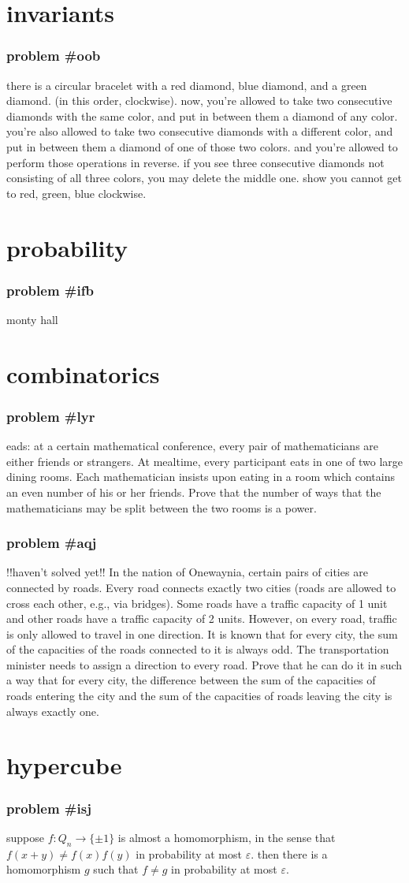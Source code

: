 \documentclass{article}
\newcommand{\problem}[1]{\subsubsection*{\textbf{problem \##1}}}
\newcommand{\chapter}[1]{\section*{#1}}
\begin{document}
\chapter{invariants}
\problem{oob} there is a circular bracelet with a red diamond, blue diamond, and a green diamond. (in this order, clockwise). now, you're allowed to take two consecutive diamonds with the same color, and put in between them a diamond of any color. you're also allowed to take two consecutive diamonds with a different color, and put in between them a diamond of one of those two colors. and you're allowed to perform those operations in reverse. if you see three consecutive diamonds not consisting of all three colors, you may delete the middle one. show you cannot get to red, green, blue clockwise.
\chapter{probability}
\problem{ifb} monty hall
\chapter{combinatorics}
\problem{lyr} eads: at a certain mathematical conference, every pair of mathematicians are either friends or strangers.
At mealtime, every participant eats in one of two large dining rooms. Each mathematician insists upon eating in a room which contains an even number of his or her friends. Prove that the number of ways that the mathematicians may be split between the two rooms is a power.
\problem{aqj} !!haven't solved yet!! In the nation of Onewaynia, certain pairs of cities are connected by roads. Every road connects exactly two cities (roads are allowed to cross each other, e.g., via bridges). Some roads have a traffic capacity of 1 unit and other roads have a traffic capacity of 2 units. However, on every road, traffic is only allowed to travel in one direction. It is known that for every city, the sum of the capacities of the roads connected to it is always odd. The transportation minister needs to assign a direction to every road. Prove that he can do it in such a way that for every city, the difference between the sum of the capacities of roads entering the city and the sum of the capacities of roads leaving the city is always exactly one.
\chapter{hypercube}
\problem{isj} suppose $f:Q_n\to \{\pm1\}$ is almost a homomorphism, in the sense that $f(x+y)\neq f(x)f(y)$ in probability at most $\varepsilon$. then there is a homomorphism $g$ such that $f\neq g$ in probability at most $\varepsilon$.
\end{document}
